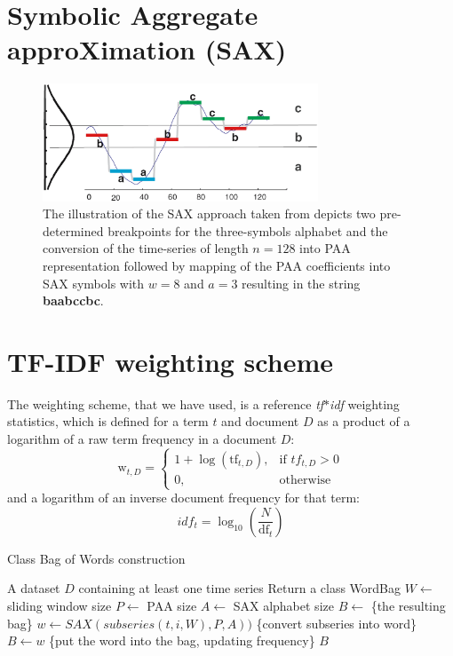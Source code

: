 \documentclass{llncs}
\begin{document}
\section{Symbolic Aggregate approXimation (SAX)} \label{sax}

\begin{figure}[tb]
   \centering
   \includegraphics[height=35mm]{figures/sax_intro.eps}
   \caption{The illustration of the SAX approach taken from \cite{sax} depicts 
    two pre-determined breakpoints for the three-symbols alphabet and the conversion of the time-series of 
    length $n=128$ into PAA representation followed by mapping of the PAA coefficients into SAX symbols with 
    $w=8$ and $a=3$ resulting in the string \textbf{baabccbc}.}
   \label{fig:sax_intro}
\end{figure}

\section{TF-IDF weighting scheme} \label{tfidf}
The weighting scheme, that we have used, is a reference \textit{tf$\ast$idf} weighting statistics,
which is defined for a term $t$ and document $D$ 
as a product of a logarithm of a raw term frequency in a document $D$:
\begin{equation}
 \mbox{w}_{t, D} =  \begin{cases} 1 + \log(\mbox{tf}_{t,D}), & \mbox{if } tf_{t,D}>0  \\ 0, & \mbox{otherwise } \end{cases}
\end{equation} 
and a logarithm of an inverse document frequency for that term:
\begin{equation}
 idf_{t} =  \log_{10}(\frac{N}{\mbox{df}_{t}})
\end{equation} 



\begin{algorithm}
\caption{Class Bag of Words construction}
\label{alg1}
\begin{algorithmic}[1]
\REQUIRE A dataset $D$ containing at least one time series
\ENSURE Return a class WordBag
\STATE $W \leftarrow$ sliding window size
\STATE $P \leftarrow$ PAA size
\STATE $A \leftarrow$ SAX alphabet size
\STATE $B \leftarrow$ \{the resulting bag\}
 \STATE $w \leftarrow SAX(subseries(t,i,W), P, A))$ \{convert subseries into word\}
 \STATE $B \leftarrow w$ \{put the word into the bag, updating frequency\}
 \ENDFOR
\ENDFOR
\RETURN $B$
\end{algorithmic}
\end{algorithm}
\end{document}
